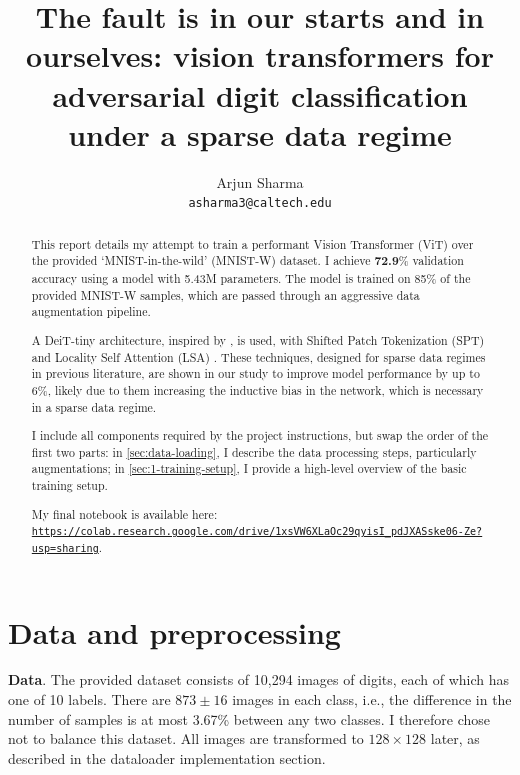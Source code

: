 \documentclass[11pt]{article}
\title{The fault is in our starts and in ourselves: vision transformers for adversarial digit classification under a sparse data regime}
\author{Arjun Sharma\\
\texttt{asharma3@caltech.edu}}
\date{}
\begin{document}
\maketitle

\begin{abstract}
    This report details my attempt to train a performant Vision Transformer (ViT) over the provided `MNIST-in-the-wild' (MNIST-W) dataset. I achieve \textbf{72.9}\% validation accuracy using a model with 5.43M parameters. The model is trained on 85\% of the provided MNIST-W samples, which are passed through an aggressive data augmentation pipeline.

    A DeiT-tiny architecture, inspired by \cite{touvron2021training}, is used, with Shifted Patch Tokenization (SPT) and Locality Self Attention (LSA) \cite{lee2021vision}. These techniques, designed for sparse data regimes in previous literature, are shown in our study to improve model performance by up to 6\%, likely due to them increasing the inductive bias in the network, which is necessary in a sparse data regime.

    I include all components required by the project instructions, but swap the order of the first two parts: in \autoref{sec:data-loading}, I describe the data processing steps, particularly augmentations; in \autoref{sec:1-training-setup}, I provide a high-level overview of the basic training setup.

    My final notebook is available here: \\\href{https://colab.research.google.com/drive/1xsVW6XLaOc29qyisI_pdJXASske06-Ze?usp=sharing}{\texttt{https://colab.research.google.com/drive/1xsVW6XLaOc29qyisI\_pdJXASske06-Ze?usp=sharing}}.

\end{abstract}






\section{Data and preprocessing}\label{sec:data-loading}


\textbf{Data}. The provided dataset consists of 10,294 images of digits, each of which has one of 10 labels. There are $873 \pm 16$ images in each class, i.e., the difference in the number of samples is at most 3.67\% between any two classes. I therefore chose not to balance this dataset. All images are transformed to $128 \times 128$ later, as described in the dataloader implementation section.
\end{document}
